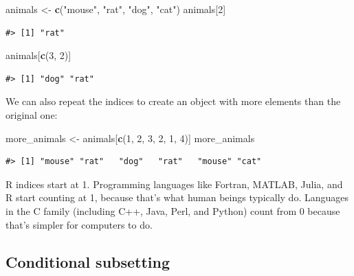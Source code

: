 \documentclass[]{book}
\newenvironment{Shaded}{\begin{snugshade}}{\end{snugshade}}
\newcommand{\KeywordTok}[1]{\textcolor[rgb]{0.13,0.29,0.53}{\textbf{#1}}}
\newcommand{\DecValTok}[1]{\textcolor[rgb]{0.00,0.00,0.81}{#1}}
\newcommand{\StringTok}[1]{\textcolor[rgb]{0.31,0.60,0.02}{#1}}
\newcommand{\NormalTok}[1]{#1}
\theoremstyle{definition}
\theoremstyle{definition}
\theoremstyle{remark}
\begin{document}
\begin{Shaded}
\begin{Highlighting}[]
\NormalTok{animals <-}\StringTok{ }\KeywordTok{c}\NormalTok{(}\StringTok{"mouse"}\NormalTok{, }\StringTok{"rat"}\NormalTok{, }\StringTok{"dog"}\NormalTok{, }\StringTok{"cat"}\NormalTok{)}
\NormalTok{animals[}\DecValTok{2}\NormalTok{]}
\end{Highlighting}
\end{Shaded}

\begin{verbatim}
#> [1] "rat"
\end{verbatim}

\begin{Shaded}
\begin{Highlighting}[]
\NormalTok{animals[}\KeywordTok{c}\NormalTok{(}\DecValTok{3}\NormalTok{, }\DecValTok{2}\NormalTok{)]}
\end{Highlighting}
\end{Shaded}

\begin{verbatim}
#> [1] "dog" "rat"
\end{verbatim}

We can also repeat the indices to create an object with more elements
than the original one:

\begin{Shaded}
\begin{Highlighting}[]
\NormalTok{more_animals <-}\StringTok{ }\NormalTok{animals[}\KeywordTok{c}\NormalTok{(}\DecValTok{1}\NormalTok{, }\DecValTok{2}\NormalTok{, }\DecValTok{3}\NormalTok{, }\DecValTok{2}\NormalTok{, }\DecValTok{1}\NormalTok{, }\DecValTok{4}\NormalTok{)]}
\NormalTok{more_animals}
\end{Highlighting}
\end{Shaded}

\begin{verbatim}
#> [1] "mouse" "rat"   "dog"   "rat"   "mouse" "cat"
\end{verbatim}

R indices start at 1. Programming languages like Fortran, MATLAB, Julia,
and R start counting at 1, because that's what human beings typically
do. Languages in the C family (including C++, Java, Perl, and Python)
count from 0 because that's simpler for computers to do.

\subsection{Conditional subsetting}\label{conditional-subsetting}
\end{document}
